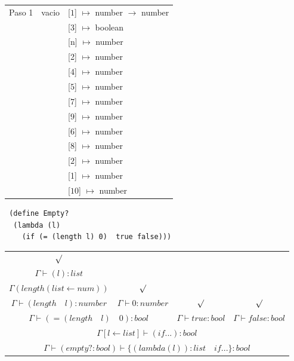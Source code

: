 \documentclass{article}
\begin{document}
\begin{center}
\begin{longtable}{ | l | p{10 cm} | p{5 cm} | }
 Paso 1  & vacio& [$\boxed{1}$] $\mapsto$ number $\rightarrow$ number \\ 
	 &	& [$\boxed{3}$] $\mapsto$ boolean \\
	 &	& [n] $\mapsto$ number \\
	 &	& [2] $\mapsto$ number \\
	 &	& [$\boxed{4}$] $\mapsto$ number \\
	 &	& [$\boxed{5}$] $\mapsto$ number \\
	 &	& [$\boxed{7}$] $\mapsto$ number \\ 
	 &	& [$\boxed{9}$] $\mapsto$ number \\ 
	 &	& [$\boxed{6}$] $\mapsto$ number \\ 
	 &	& [$\boxed{8}$] $\mapsto$ number \\ 
	 &	& [$\boxed{2}$] $\mapsto$ number \\ 
	 &	& [1] $\mapsto$ number \\ 
	 &	& [$\boxed{10}$] $\mapsto$ number \\ \hline
 \end{longtable}

\end{center}

\begin{lstlisting}
 (define Empty?
  (lambda (l)
    (if (= (length l) 0)  true false)))
\end{lstlisting}

\begin{center}
 \begin{longtable}{c c c c}
 $\surd$ &	&	& \\ \cline{1-1}
 $\Gamma \vdash (l) : list$ &	&  & \\ \cline{1-1}
 $\Gamma (length (list \gets num))$ & $\surd$ & & \\ \cline{1-2}
 $\Gamma \vdash (length  \quad l):number$ & $\Gamma \vdash 0:number$ & $\surd$ & $\surd$ \\ \hline
 \multicolumn{2}{c}{$\Gamma \vdash (=(length  \quad l) \quad 0):bool$} & $\Gamma \vdash true:bool$ & $\Gamma \vdash false:bool$ \\ \hline
 \multicolumn{4}{c}{$\Gamma [l \gets list] \vdash (if...):bool$} \\ \hline
 \multicolumn{4}{c}{$\Gamma \vdash (empty?:bool) \vdash \{(lambda(l)):list \quad if...\}:bool$} \\

\end{longtable}

\end{center}
\end{document}
